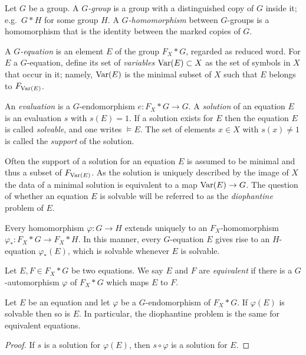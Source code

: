 \documentclass[a4paper,11pt]{amsart}
\begin{document}
\begin{defi}
  Let $G$ be a group. A \emph{$G$-group} is a group with a
  distinguished copy of $G$ inside it; e.g.\ $G*H$ for some group
  $H$. A \emph{$G$-homomorphism} between $G$-groups is a homomorphism
  that is the identity between the marked copies of $G$.

  A \emph{$G$-equation} is an element $E$ of the group $F_X * G$,
  regarded as reduced word. For $E$ a $G$-equation, define its set of
  \emph{variables} $\textup{Var}(E)\subset X$ as the set of symbols in $X$
  that occur in it; namely, $\textup{Var}(E)$ is the minimal subset of $X$
  such that $E$ belongs to $F_{\textup{Var}(E)}$.

  An \emph{evaluation} is a $G$-endomorphism $e\colon F_X * G \to G$.
  A \emph{solution} of an equation $E$ is an evaluation $s$ with
  $s(E)=1$. If a solution exists for $E$ then the equation $E$ is
  called \emph{solvable}, and one writes $\models E$.  The set of
  elements $x\in X$ with $s(x)\neq 1$ is called the \emph{support} of
  the solution.
\end{defi}

Often the support of a solution for an equation $E$ is assumed to be
minimal and thus a subset of $F_{\textup{Var}(E)}$.  As the solution is
uniquely described by the image of $X$ the data of a minimal solution
is equivalent to a map $\textup{Var}(E) \to G$.  The question of whether an
equation $E$ is solvable will be referred to as the \emph{diophantine}
problem of $E$.

Every homomorphism $\varphi \colon G \to H$ extends uniquely to an
$F_X$-homomorphism $\varphi_* \colon F_X*G \to F_X*H$. In this manner,
every $G$-equation $E$ gives rise to an $H$-equation $\varphi_*(E)$,
which is solvable whenever $E$ is solvable.

\begin{defi}
  Let $E,F\in F_X* G$ be two equations. We say $E$ and $F$ are
  \emph{equivalent} if there is a $G$-automorphism $\varphi$ of
  $F_X*G$ which maps $E$ to $F$.
\end{defi}
\begin{lem}
  Let $E$ be an equation and let $\varphi$ be a $G$-endomorphism of
  $F_X*G$. If $\varphi(E)$ is solvable then so is $E$. In particular,
  the diophantine problem is the same for equivalent equations.
\end{lem}
\begin{proof}
  If $s$ is a solution for $\varphi(E)$, then $s\circ\varphi$ is a
  solution for $E$.
\end{proof}
\end{document}
